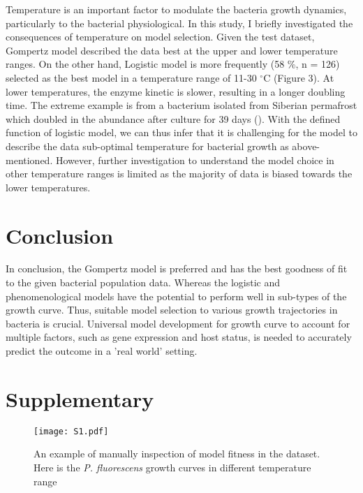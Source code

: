\documentclass[12pt]{article}
\newcommand{\beginsupplement}{%
        \setcounter{table}{0}
        \renewcommand{\thetable}{S\arabic{table}}%
        \setcounter{figure}{0}
        \renewcommand{\thefigure}{S\arabic{figure}}%
     } %
\begin{document}
\begin{linenumbers}
 \noindent Temperature is an important factor to modulate the bacteria growth dynamics, particularly to the bacterial physiological. In this study, I briefly investigated the consequences of temperature on model selection. Given the test dataset, Gompertz model described the data best at the upper and lower temperature ranges. On the other hand, Logistic model is more frequently (58 \%, n = 126) selected as the best model in a temperature range of 11-30 $^{\circ}$C (Figure 3). At lower temperatures, the enzyme kinetic is slower, resulting in a longer doubling time. The extreme example is from a bacterium isolated from  Siberian permafrost which doubled in the abundance after culture for 39 days (\cite{bakermans_reproduction_2003}). With the defined function of logistic model, we can thus infer that it is challenging for the model to describe the data sub-optimal temperature for bacterial growth as above-mentioned. However, further investigation to understand the model choice in other temperature ranges is limited as the majority of data is biased towards the lower temperatures.
 
 \section{Conclusion}
 
 \noindent In conclusion, the Gompertz model is preferred and has the best goodness of fit to the given bacterial population data. Whereas the logistic and phenomenological models have the potential to perform well in sub-types of the growth curve. Thus, suitable model selection to various growth trajectories in bacteria is crucial. Universal model development for growth curve to account for multiple factors, such as gene expression and host status, is needed to accurately predict the outcome in a 'real world' setting.
 
 \printbibliography

\end{linenumbers}
\newpage

\section{Supplementary}

\beginsupplement
  \begin{figure}[H]
    \centering
    \texttt{[image: S1.pdf]}
    \caption{An example of manually inspection of model fitness in the dataset. Here is the \textit{P. fluorescens} growth curves in different temperature range}
  \end{figure}

 
\end{document}
